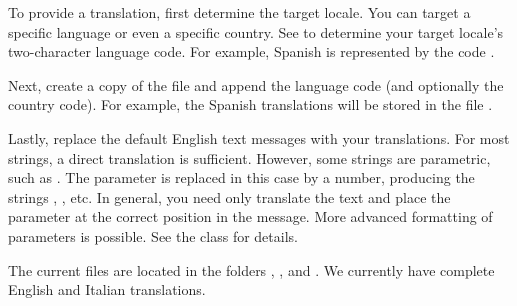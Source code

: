 To provide a translation, first determine the target locale.  You can target a specific language or even a specific country.  See  to determine your target locale's two-character language code.  For example, Spanish is represented by the code .

Next, create a copy of the  file and append the language code (and optionally the country code).  For example, the Spanish translations will be stored in the file .

Lastly, replace the default English text messages with your translations.  For most strings, a direct translation is sufficient.  However, some strings are parametric, such as .  The parameter  is replaced in this case by a number, producing the strings , , etc.  In general, you need only translate the text and place the parameter at the correct position in the message.  More advanced formatting of parameters is possible.  See the  class for details.

The current  files are located in the folders , , and .  We currently have complete English and Italian translations.